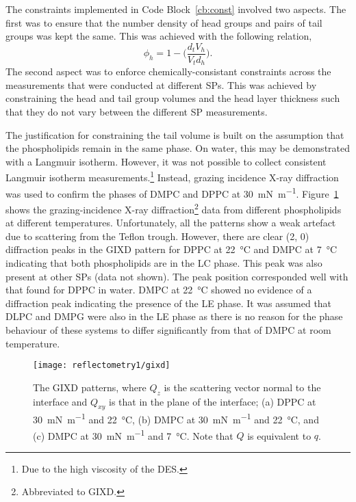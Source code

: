 %

The constraints implemented in Code Block~\ref{cb:const} involved two aspects.
The first was to ensure that the number density of head groups and pairs of tail groups was kept the same.
This was achieved with the following relation,\autocite{braun_polymers_2017}
%
\begin{equation}
\phi_h = 1 - \bigg(\frac{d_tV_h}{V_td_h}\bigg).
\label{equ:phih}
\end{equation}
%
The second aspect was to enforce chemically-consistant constraints across the measurements that were conducted at different SPs.
This was achieved by constraining the head and tail group volumes and the head layer thickness such that they do not vary between the different SP measurements.

The justification for constraining the tail volume is built on the assumption that the phospholipids remain in the same phase.
On water, this may be demonstrated with a Langmuir isotherm.
However, it was not possible to collect consistent Langmuir isotherm measurements.\footnote{Due to the high viscosity of the DES.}
Instead, grazing incidence X-ray diffraction was used to confirm the phases of DMPC and DPPC at \SI{30}{\milli\newton\per\meter}.
Figure~\ref{fig:gixd} shows the grazing-incidence X-ray diffraction\footnote{Abbreviated to GIXD.} data from different phospholipids at different temperatures.
Unfortunately, all the patterns show a weak artefact due to scattering from the Teflon trough.
However, there are clear (2, 0) diffraction peaks in the GIXD pattern for DPPC at \SI{22}{\celsius} and DMPC at \SI{7}{\celsius} indicating that both phospholipids are in the LC phase.
This peak was also present at other SPs (data not shown).
The peak position corresponded well with that found for DPPC in water.\autocite{watkins_structure_2009}
DMPC at \SI{22}{\celsius} showed no evidence of a diffraction peak indicating the presence of the LE phase.
It was assumed that DLPC and DMPG were also in the LE phase as there is no reason for the phase behaviour of these systems to differ significantly from that of DMPC at room temperature.
%
\begin{figure}[t]
    \forcerectofloat
    \centering
    \texttt{[image: reflectometry1/gixd]}
    \caption{The GIXD patterns, where $Q_z$ is the scattering vector normal to the interface and $Q_{xy}$ is that in the plane of the interface; (a) DPPC at \SI{30}{\milli\newton\per\meter} and \SI{22}{\celsius}, (b) DMPC at \SI{30}{\milli\newton\per\meter} and \SI{22}{\celsius}, and (c) DMPC at \SI{30}{\milli\newton\per\meter} and \SI{7}{\celsius}. Note that $Q$ is equivalent to $q$.}
    \label{fig:gixd}
\end{figure}
%

